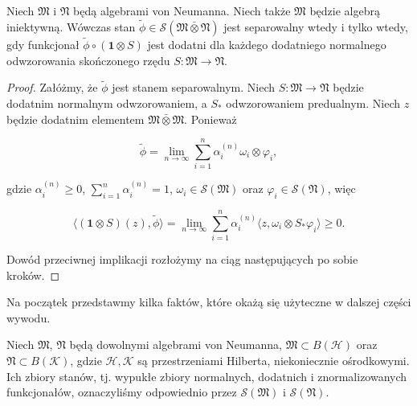 \begin{Theorem}
    \label{thm:PHcrit}
    Niech $\mathfrak{M}$ i  $\mathfrak{N}$ będą algebrami von Neumanna.
    Niech także  $\mathfrak{M}$ będzie algebrą iniektywną.
    Wówczas stan $\tilde{\phi} \in \mathcal{S}(\mathfrak{M} \bar{\otimes} \mathfrak{N})$
    jest separowalny wtedy i tylko wtedy, gdy funkcjonał
    $\tilde{\phi} \circ (\mathbf{1} \otimes S)$
    jest dodatni dla każdego dodatniego normalnego odwzorowania skończonego rzędu
    $S\!: \mathfrak{M} \rightarrow \mathfrak{N}$.
\end{Theorem}

\begin{proof}
Załóżmy, że $\tilde{\phi}$ jest stanem separowalnym.
Niech $S: \mathfrak{M} \rightarrow \mathfrak{N}$ będzie
dodatnim normalnym odwzorowaniem, a $S_*$ odwzorowaniem predualnym.
Niech $z$ będzie dodatnim elementem
$\mathfrak{M} \bar{\otimes} \mathfrak{M}$.
Ponieważ
\begin{linenomath*}
 \begin{equation}
    \tilde{\phi} =\lim \limits_{n \rightarrow \infty}
\sum_{i=1}^{n}\alpha_i^{(n)} \omega_{i} \otimes \varphi_{i},
 \end{equation}
\end{linenomath*}
gdzie
$\alpha_i^{(n)}\geq 0$, $\sum_{i=1}^n\alpha_i^{(n)}=1$,
$\omega_{i}\in\mathcal{S}(\mathfrak{M})$
oraz
$\varphi_{i}\in\mathcal{S}(\mathfrak{N})$,
więc
\begin{linenomath*}
 \begin{equation}
 \langle (\mathbf{1} \otimes S)(z), \tilde{\phi} \rangle =
 \lim \limits_{n \rightarrow \infty}\sum \limits_{i = 1}^{n}\alpha_i^{(n)}
 \langle z, \omega_{i} \otimes S_{*} \varphi_{i} \rangle \geq 0.
 \end{equation}
\end{linenomath*}
Dowód przeciwnej implikacji rozłożymy na ciąg następujących po sobie kroków.
\end{proof}

Na początek przedstawmy kilka faktów, które okażą się użyteczne w dalszej
części wywodu.

Niech  $\mathfrak{M}$, $\mathfrak{N}$
będą dowolnymi algebrami von Neumanna,
$\mathfrak{M}\subset B(\mathcal{H})$ oraz $\mathfrak{N}\subset B(\mathcal{K})$,
gdzie  $\mathcal{H},\mathcal{K}$
są przestrzeniami Hilberta, niekoniecznie ośrodkowymi.
Ich zbiory stanów, tj. wypukłe zbiory normalnych, dodatnich i znormalizowanych
funkcjonałów, oznaczyliśmy odpowiednio przez
$\mathcal{S}(\mathfrak{M})$ i $\mathcal{S}(\mathfrak{N})$.

